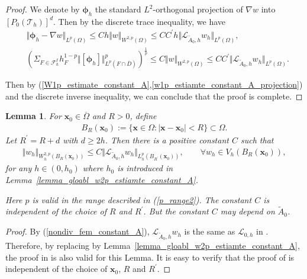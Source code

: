\documentclass[12pt]{amsart}
\newcommand{\boldx}{\boldsymbol{x}}
\newtheorem{lemma}{Lemma}[section]
\theoremstyle{definition}
\theoremstyle{remark}
\begin{document}
\begin{proof}
We denote by $\boldsymbol{\phi}_{h}$ the standard $L^{2}$-orthogonal projection 
of $\nabla w$ into $[P_{0}(\mathcal{T}_{h})]^{d}$. 
Then by the discrete trace inequality, we have 
\begin{align}
\label{w1p_estiamte_constant_A_projection}
& \Vert \boldsymbol{\phi}_{h} - \nabla w \Vert_{L^{p}(\Omega)} 
\leq C h \Vert w\Vert_{W^{2,p}(\Omega)} 
\leq C C^{\prime} h \Vert \mathcal{L}_{\tilde{A}_{0},h}w_{h}\Vert_{L^{p}(\Omega)},\\
\nonumber
& \left( \Sigma_{F \in \mathcal{F}_{h}^{I}} h_{F}^{1-p}\Vert [\boldsymbol{\phi}_{h}] \Vert_{L^{p}(F\cap 
\overline{D})}^{p} \right)^{\frac{1}{p}}
\leq C \Vert w\Vert_{W^{2,p}(\Omega)} 
\leq C C^{\prime} \Vert \mathcal{L}_{\tilde{A}_{0},h}w_{h}\Vert_{L^{p}(\Omega)}. 
\end{align}

Then by (\ref{W1p_estimate_constant_A},\ref{w1p_estiamte_constant_A_projection}) and 
the discrete inverse inequality, we can conclude that the proof is complete.
\end{proof}

\begin{lemma}
\label{lemma_local_estimate_constant_A}
For $\boldx_{0} \in \overline{\Omega}$ and $R > 0$, define 
\begin{align*}
B_{R}(\boldx_{0}) := \{ \boldx \in \Omega: \vert \boldx - \boldx_{0} \vert < R \} \subset \Omega.
\end{align*}
Let $R^{\prime} = R + d$ with $d \geq 2h$. 
Then there is a positive constant $C$ such that 
\begin{align}
\label{local_estimate_constant_A}
\Vert w_{h}\Vert_{W_{h}^{2,p}(B_{R}(\boldx_{0}))} \leq C \Vert \mathcal{L}_{\tilde{A}_{0},h}w_{h}
\Vert_{L_{h}^{p}(B_{R^{\prime}}(\boldx_{0}))},\qquad \forall w_{h} \in V_{h}(B_{R}(\boldx_{0})),
\end{align}
for any $h \in (0, h_{0})$ where $h_{0}$ is introduced in Lemma~\ref{lemma_gloabl_w2p_estiamte_constant_A}.

Here $p$ is valid in the range described in (\ref{p_range2}).
The constant $C$ is independent of the choice of $R$ and $R^{\prime}$. 
But the constant $C$ may depend on $\tilde{A}_{0}$.
\end{lemma}

\begin{proof}
By (\ref{nondiv_fem_constant_A}), $\mathcal{L}_{\tilde{A}_{0},h}w_{h}$ is the same as 
$\mathcal{L}_{0,h}$ in \cite[Lemma~$2.7$]{FHM2017}. Therefore, by replacing \cite[Lemma~$2.6$]{FHM2017}
by Lemma~\ref{lemma_gloabl_w2p_estiamte_constant_A}, the proof in \cite[Lemma~$2.7$]{FHM2017} 
is also valid for this Lemma. It is easy to verify that the proof of \cite[Lemma~$2.7$]{FHM2017} 
is independent of the choice of $\boldx_{0}$, $R$ and $R^{\prime}$.
\end{proof}
\end{document}
